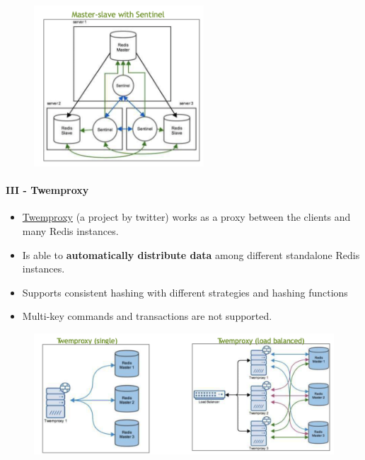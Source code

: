 \documentclass[10pt,a4paper]{article}
\begin{document}
\begin{figure}[h!]
 \hfill \includegraphics[width=180pt]{images/redis-sentinel.png}\hspace*{\fill}
\end{figure} 

\paragraph{III - Twemproxy} 
\begin{itemize}
	\item \href{https://github.com/twitter/twemproxy}{Twemproxy} (a project by twitter) works  as a proxy between the clients and many Redis instances.
	\item Is able to \textbf{automatically distribute data} among different standalone Redis instances.
	\item Supports consistent hashing with different strategies and hashing functions
	\item Multi-key commands and transactions are not supported.
\end{itemize}

\begin{figure}[h!]
 \hfill \includegraphics[width=350pt]{images/redis-twemproxy.png}\hspace*{\fill}
\end{figure} 
\end{document}
